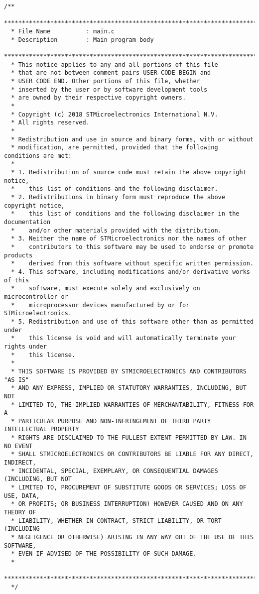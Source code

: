 \begin{lstlisting}[label=algoritmo:main.c,style = STM-code,frame=single,caption=main.c]
/**
  ******************************************************************************
  * File Name          : main.c
  * Description        : Main program body
  ******************************************************************************
  * This notice applies to any and all portions of this file
  * that are not between comment pairs USER CODE BEGIN and
  * USER CODE END. Other portions of this file, whether 
  * inserted by the user or by software development tools
  * are owned by their respective copyright owners.
  *
  * Copyright (c) 2018 STMicroelectronics International N.V. 
  * All rights reserved.
  *
  * Redistribution and use in source and binary forms, with or without 
  * modification, are permitted, provided that the following conditions are met:
  *
  * 1. Redistribution of source code must retain the above copyright notice, 
  *    this list of conditions and the following disclaimer.
  * 2. Redistributions in binary form must reproduce the above copyright notice,
  *    this list of conditions and the following disclaimer in the documentation
  *    and/or other materials provided with the distribution.
  * 3. Neither the name of STMicroelectronics nor the names of other 
  *    contributors to this software may be used to endorse or promote products 
  *    derived from this software without specific written permission.
  * 4. This software, including modifications and/or derivative works of this 
  *    software, must execute solely and exclusively on microcontroller or
  *    microprocessor devices manufactured by or for STMicroelectronics.
  * 5. Redistribution and use of this software other than as permitted under 
  *    this license is void and will automatically terminate your rights under 
  *    this license. 
  *
  * THIS SOFTWARE IS PROVIDED BY STMICROELECTRONICS AND CONTRIBUTORS "AS IS" 
  * AND ANY EXPRESS, IMPLIED OR STATUTORY WARRANTIES, INCLUDING, BUT NOT 
  * LIMITED TO, THE IMPLIED WARRANTIES OF MERCHANTABILITY, FITNESS FOR A 
  * PARTICULAR PURPOSE AND NON-INFRINGEMENT OF THIRD PARTY INTELLECTUAL PROPERTY
  * RIGHTS ARE DISCLAIMED TO THE FULLEST EXTENT PERMITTED BY LAW. IN NO EVENT 
  * SHALL STMICROELECTRONICS OR CONTRIBUTORS BE LIABLE FOR ANY DIRECT, INDIRECT,
  * INCIDENTAL, SPECIAL, EXEMPLARY, OR CONSEQUENTIAL DAMAGES (INCLUDING, BUT NOT
  * LIMITED TO, PROCUREMENT OF SUBSTITUTE GOODS OR SERVICES; LOSS OF USE, DATA, 
  * OR PROFITS; OR BUSINESS INTERRUPTION) HOWEVER CAUSED AND ON ANY THEORY OF 
  * LIABILITY, WHETHER IN CONTRACT, STRICT LIABILITY, OR TORT (INCLUDING 
  * NEGLIGENCE OR OTHERWISE) ARISING IN ANY WAY OUT OF THE USE OF THIS SOFTWARE,
  * EVEN IF ADVISED OF THE POSSIBILITY OF SUCH DAMAGE.
  *
  ******************************************************************************
  */


\end{lstlisting}
